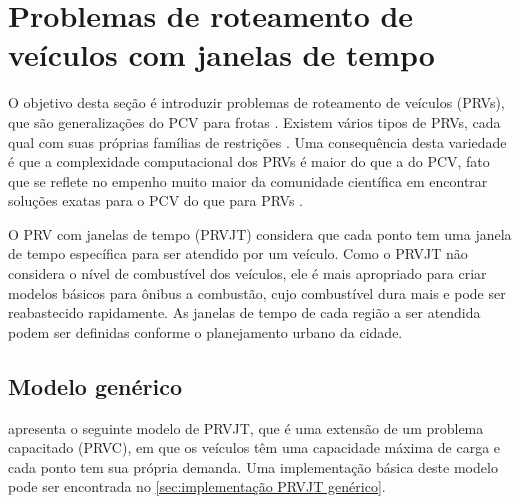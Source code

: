 \section{Problemas de roteamento de veículos com janelas de tempo}\label{sec:PRVJT}
O objetivo desta seção é introduzir problemas de roteamento de veículos (PRVs), que são generalizações do PCV para frotas \cite{DANTZIG:59}. Existem vários tipos de PRVs, cada qual com suas próprias famílias de restrições \cite{TORO:16,VIEIRA:13}. Uma consequência desta variedade é que a complexidade computacional dos PRVs é maior do que a do PCV, fato que se reflete no empenho muito maior da comunidade científica em encontrar soluções exatas para o PCV do que para PRVs \cite{LAPORTE:87}.

O PRV com janelas de tempo (PRVJT) considera que cada ponto tem uma janela de tempo específica para ser atendido por um veículo. Como o PRVJT não considera o nível de combustível dos veículos, ele é mais apropriado para criar modelos básicos para ônibus a combustão, cujo combustível dura mais e pode ser reabastecido rapidamente. As janelas de tempo de cada região a ser atendida podem ser definidas conforme o planejamento urbano da cidade.

\subsection{Modelo genérico}\label{sec:PRVJT genérico}
\textcite{VIEIRA:13} apresenta o seguinte modelo de PRVJT, que é uma extensão de um problema capacitado (PRVC), em que os veículos têm uma capacidade máxima de carga e cada ponto tem sua própria demanda. Uma implementação básica deste modelo pode ser encontrada no \cref{sec:implementação PRVJT genérico}.

